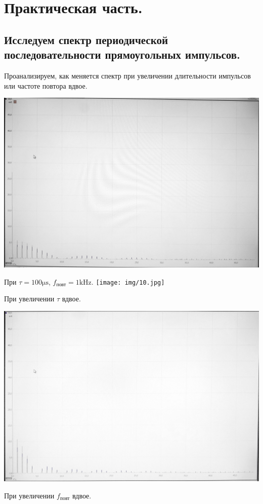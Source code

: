 \documentclass[12pt,a4paper]{article}
\begin{document}
\section{Практическая часть.}
    \subsection{Исследуем спектр периодической последовательности прямоугольных импульсов.}
        
        Проанализируем, как меняется спектр при увеличении длительности импульсов или частоте повтора вдвое.
        \begin{center}
            \includegraphics[width=0.85\linewidth]{img/9.jpg}
       
            При $\tau = 100 \si{\micro\second}$, $f_{\text{повт}} = 1\si{\kilo\hertz}$. 
            \texttt{[image: img/10.jpg]}
            
            При увеличении $\tau$ вдвое.
        
            \includegraphics[width=0.85\linewidth]{img/8.jpg}
        
            При увеличении $f_{\text{повт}}$ вдвое.
        \end{center}
        
\end{document}
